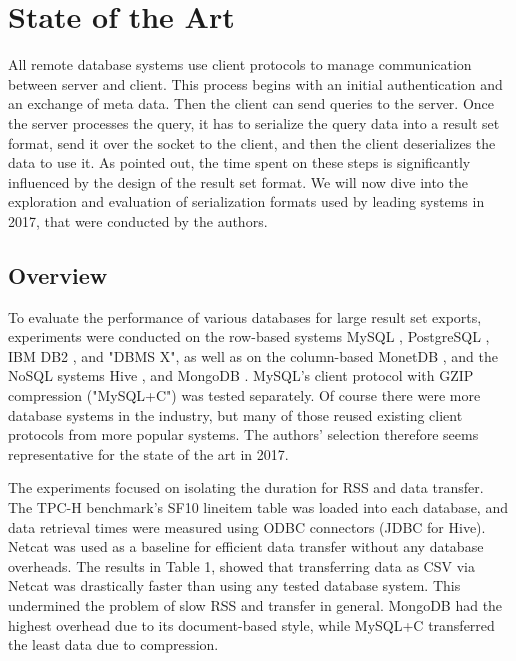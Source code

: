 \documentclass[sigconf]{acmart}
\begin{document}
\section{State of the Art}
All remote database systems use client protocols to manage communication between server and client. This process begins with an initial authentication and an exchange of meta data. Then the client can send queries to the server. Once the server processes the query, it has to serialize the query data into a result set format, send it over the socket to the client, and then the client deserializes the data to use it.
As pointed out, the time spent on these steps is significantly influenced by the design of the result set format. We will now dive into the exploration and evaluation of serialization formats used by leading systems in 2017, that were conducted by the authors.

\subsection{Overview}
To evaluate the performance of various databases for large result set exports, experiments were conducted on the row-based systems MySQL \cite{widenius2002mysql}, PostgreSQL \cite{stonebraker1991postgres}, IBM DB2 \cite{zikopoulos2001db2}, and "DBMS X", as well as on the column-based MonetDB \cite{boncz2008breaking}, and the NoSQL systems Hive \cite{thusoo2010hive}, and MongoDB \cite{mongodb2016architecture}. MySQL's client protocol with GZIP compression ("MySQL+C") was tested separately. Of course there were more database systems in the industry, but many of those reused existing client protocols from more popular systems. The authors' selection therefore seems representative for the state of the art in 2017.

The experiments focused on isolating the duration for RSS and data transfer. The TPC-H benchmark's SF10 lineitem table was loaded into each database, and data retrieval times were measured using ODBC connectors (JDBC for Hive). Netcat \cite{gibson2016ncat} was used as a baseline for efficient data transfer without any database overheads. The results in Table 1, showed that transferring data as CSV via Netcat was drastically faster than using any tested database system. This undermined the problem of slow RSS and transfer in general. MongoDB had the highest overhead due to its document-based style, while MySQL+C transferred the least data due to compression.
\end{document}
